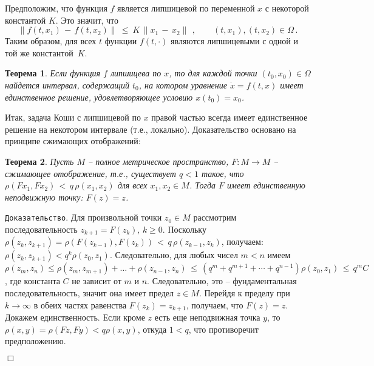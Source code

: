 \documentclass[12pt,a4paper]{article}
\newtheorem{theorem}{Теорема}
\begin{document}
Предположим, что функция $f$ является липшицевой по переменной $x$ с некоторой константой $K$. Это значит, что
$$
\|f(t, x_1) \, - \, f(t, x_2)\| \ \le \ K \, \|x_1 \, - \, x_2\|\ \, , \qquad (t, x_1), (t, x_2) \in \Omega\, .
$$
Таким образом, для всех  $t$ функции $f(t, \cdot)$ являются липшицевыми с одной и той же константой~$K$.
\begin{theorem}\label{th.eu-1}
Если функция $f$ липшицева по $x$, то для каждой точки $(t_0, x_0) \in \Omega$ найдется
интервал, содержащий $t_0$, на котором уравнение $\dot x = f(t, x)$ имеет единственное решение,
 удовлетворяющее условию $x(t_0) = x_0$.
\end{theorem}
Итак, задача Коши с липшицевой по $x$ правой частью всегда имеет единственное решение на некотором интервале
(т.е., локально). Доказательство основано на принципе сжимающих отображений:
\begin{theorem}\label{th.contr}
Пусть $M$ -- полное метрическое пространство, $F : M \to M$ -- сжимающее отображение, т.е.,
существует $q< 1$ такое, что $\rho(Fx_1, Fx_2) \, < \, q\, \rho(x_1, x_2)$ для всех $x_1, x_2 \in M$.
Тогда $F$ имеет единственную неподвижную точку: $F(z) = z$.
\end{theorem}
{\tt Доказательство}. Для произвольной точки $z_0\in M$ рассмотрим последовательность $z_{k+1} = F(z_k), \, k \ge 0$.
Поскольку $\rho(z_{k}, z_{k+1}) = \rho(F(z_{k-1}), F(z_{k}))\,  < \, q\, \rho(z_{k-1}, z_{k})$, получаем:
$\rho(z_{k}, z_{k+1}) < q^k \rho(z_0, z_1)$. Следовательно, для любых чисел $m < n$ имеем
$\rho(z_m, z_n) \le \rho(z_m, z_{m+1})+ \ldots + \rho(z_{n-1}, z_n) \, \le \,
(q^m + q^{m+1} + \cdots + q^{n-1})\rho(z_0, z_1) \, \le \, q^m C$, где константа $C$ не зависит от
$m$ и $n$. Следовательно, это -- фундаментальная последовательность, значит она имеет предел $z \in M$.
Перейдя к пределу при $k \to \infty$ в обеих частях равенства $F(z_k) = z_{k+1}$, получаем, что
$F(z) = z$. Докажем единственность. Если кроме $z$ есть еще неподвижная точка $y$, то $\rho(x, y) = \rho(Fz, Fy) < q \rho(x, y) $,  откуда $1 < q$, что противоречит предположению.

   {\hfill $\Box$}
\medskip
\end{document}
